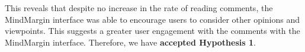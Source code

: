 This reveals that despite no increase in the rate of reading comments, the MindMargin interface was able to encourage users to consider other opinions and viewpoints. This suggests a greater user engagement with the comments with the MindMargin interface. Therefore, we have \textbf{accepted Hypothesis 1}.

